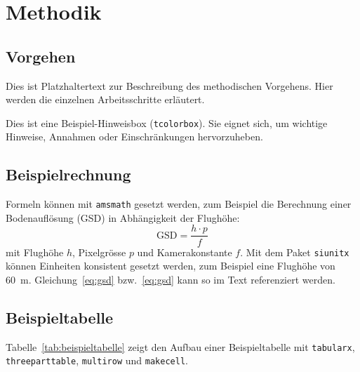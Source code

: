 \section{Methodik}
\label{sec:methodik}

\subsection{Vorgehen}
\label{subsec:vorgehen}
Dies ist Platzhaltertext zur Beschreibung des methodischen Vorgehens. Hier werden die
einzelnen Arbeitsschritte erläutert.

\begin{tcolorbox}[myboxstyle, title=Hinweis]
Dies ist eine Beispiel-Hinweisbox (\texttt{tcolorbox}). Sie eignet sich, um wichtige
Hinweise, Annahmen oder Einschränkungen hervorzuheben.
\end{tcolorbox}

\subsection{Beispielrechnung}
\label{subsec:beispielrechnung}
Formeln können mit \texttt{amsmath} gesetzt werden, zum Beispiel die Berechnung einer
Bodenauflösung (GSD) in Abhängigkeit der Flughöhe:
\begin{equation}
    \text{GSD} = \frac{h \cdot p}{f}
    \label{eq:gsd}
\end{equation}
mit Flughöhe $h$, Pixelgrösse $p$ und Kamerakonstante $f$. Mit dem Paket \texttt{siunitx}
können Einheiten konsistent gesetzt werden, zum Beispiel eine Flughöhe von \SI{60}{\meter}.
Gleichung~\ref{eq:gsd} bzw.\ \cref{eq:gsd} kann so im Text referenziert werden.

\subsection{Beispieltabelle}
\label{subsec:beispieltabelle}
Tabelle~\ref{tab:beispieltabelle} zeigt den Aufbau einer Beispieltabelle mit
\texttt{tabularx}, \texttt{threeparttable}, \texttt{multirow} und \texttt{makecell}.

